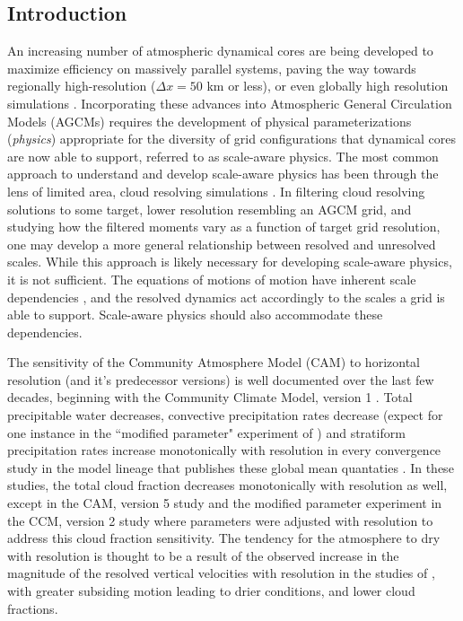 \subsection{Introduction}

An increasing number of atmospheric dynamical cores are being developed to maximize efficiency on massively parallel systems, paving the way towards regionally high-resolution ($\Delta x = 50$ km or less), or even globally high resolution simulations \citep{MPASatm,Z2014QJRMS,HETAL2016JCLIM,DCMIP16,LetAl2018JAMES}. Incorporating these advances into Atmospheric General Circulation Models (AGCMs) requires the development of physical parameterizations ({\em{physics}}) appropriate for the diversity of grid configurations that dynamical cores are now able to support, referred to as scale-aware physics. The most common approach to understand and develop scale-aware physics has been through the lens of limited area, cloud resolving simulations \citep[e.g.,][]{PC2008JAS,AW2013JAS,SZ2018JCLIM}. In filtering cloud resolving solutions to some target, lower resolution resembling an AGCM grid, and studying how the filtered moments vary as a function of target grid resolution, one may develop a more general relationship between resolved and unresolved scales. While this approach is likely necessary for developing scale-aware physics, it is not sufficient. The equations of motions of motion have inherent scale dependencies \citep{O1981JAS,WETAL1997MWR,PG2006JAS,J2017JAMES}, and the resolved dynamics act accordingly to the scales a grid is able to support. Scale-aware physics should also accommodate these dependencies.

The sensitivity of the Community Atmosphere Model (CAM) to horizontal resolution (and it's predecessor versions) is well documented over the last few decades, beginning with the Community Climate Model, version 1 \citep[CCM1;][]{KW1991JGR}. Total precipitable water decreases, convective precipitation rates decrease (expect for one instance in the ``modified parameter" experiment of \cite{WETAL1995CD}) and stratiform precipitation rates increase monotonically with resolution in every convergence study in the model lineage that publishes these global mean quantaties \citep{KW1991JGR,WETAL1995CD,W2008TELLUS,RETAL2013JCLIM,ZetAl2014JCb,HR2017JCLIM}. In these studies, the total cloud fraction decreases monotonically with resolution as well, except in the CAM, version 5 study \citep[CAM5;][]{ZetAl2014JCb} and the modified parameter experiment in the CCM, version 2 study \citep[CCM2;][]{WETAL1995CD} where parameters were adjusted with resolution to address this cloud fraction sensitivity. The tendency for the atmosphere to dry with resolution is thought to be a result of the observed increase in the magnitude of the resolved vertical velocities with resolution in the studies of \citep{KW1991JGR,WETAL1995CD,HR2017JCLIM}, with greater subsiding motion leading to drier conditions, and lower cloud fractions. 

